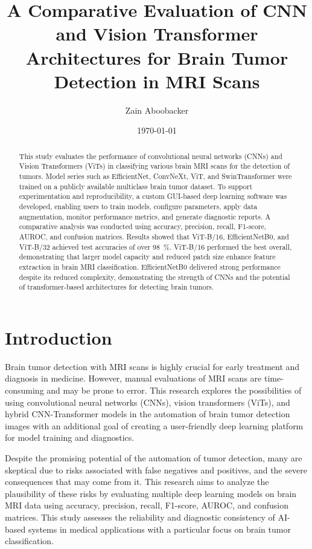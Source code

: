 \documentclass[11pt]{article}
\title{\textbf{A Comparative Evaluation of CNN and Vision Transformer Architectures for Brain Tumor Detection in MRI Scans}}
\author{Zain Aboobacker}
\affil{Natick High School}
\date{\today}
\begin{document}
\maketitle

\begin{abstract}
This study evaluates the performance of convolutional neural networks (CNNs) and Vision Transformers (ViTs) in classifying various brain MRI scans for the detection of tumors. Model series such as EfficientNet, ConvNeXt, ViT, and SwinTransformer were trained on a publicly available multiclass brain tumor dataset. To support experimentation and reproducibility, a custom GUI-based deep learning software was developed, enabling users to train models, configure parameters, apply data augmentation, monitor performance metrics, and generate diagnostic reports. A comparative analysis was conducted using accuracy, precision, recall, F1-score, AUROC, and confusion matrices. Results showed that ViT-B/16, EfficientNetB0, and ViT-B/32 achieved test accuracies of over 98~\%. ViT-B/16 performed the best overall, demonstrating that larger model capacity and reduced patch size enhance feature extraction in brain MRI classification. EfficientNetB0 delivered strong performance despite its reduced complexity, demonstrating the strength of CNNs and the potential of transformer-based architectures for detecting brain tumors.
\end{abstract}

\section{Introduction}

Brain tumor detection with MRI scans is highly crucial for early treatment and diagnosis in medicine. However, manual evaluations of MRI scans are time-consuming and may be prone to error. This research explores the possibilities of using convolutional neural networks (CNNs), vision transformers (ViTs), and hybrid CNN-Transformer models in the automation of brain tumor detection images with an additional goal of creating a user-friendly deep learning platform for model training and diagnostics. 

Despite the promising potential of the automation of tumor detection, many are skeptical due to risks associated with false negatives and positives, and the severe consequences that may come from it. This research aims to analyze the plausibility of these risks by evaluating multiple deep learning models on brain MRI data using accuracy, precision, recall, F1-score, AUROC, and confusion matrices. This study assesses the reliability and diagnostic consistency of AI-based systems in medical applications with a particular focus on brain tumor classification.
\end{document}
